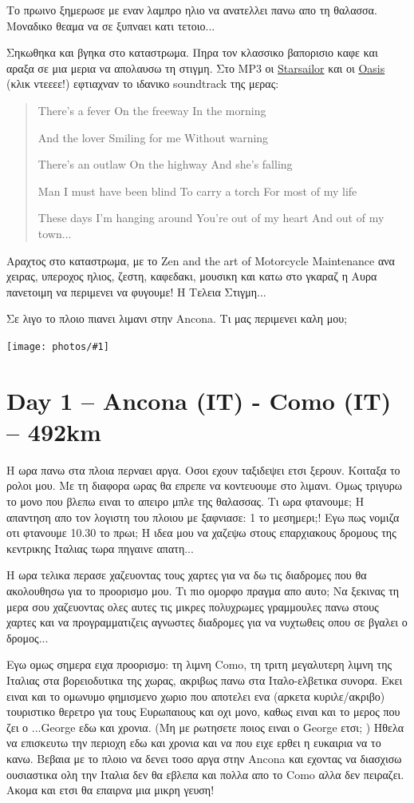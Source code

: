 \documentclass[11pt, letterpaper]{book}
\newcommand\photo[1]{\noindent\texttt{[image: photos/\#1]}}
\begin{document}
Το πρωινο ξημερωσε με εναν λαμπρο ηλιο να ανατελλει πανω απο τη θαλασσα. Μοναδικο θεαμα να σε ξυπναει κατι τετοιο...

Σηκωθηκα και βγηκα στο καταστρωμα. Πηρα τον κλασσικο βαπορισιο καφε και αραξα σε μια μερια να απολαυσω τη στιγμη. Στο MP3 οι \href{http://goo.gl/HcaG4}{Starsailor} και οι \href{http://goo.gl/6sdDG}{Oasis} (κλικ ντεεεε!) εφτιαχναν το ιδανικο soundtrack της μερας:

\begin{verse}
There's a fever
On the freeway
In the morning

And the lover
Smiling for me
Without warning

There's an outlaw
On the highway
And she's falling

Man I must have been blind
To carry a torch
For most of my life

These days I'm hanging around
You're out of my heart
And out of my town...
\end{verse}

Αραχτος στο καταστρωμα, με το Zen and the art of Motorcycle Maintenance ανα χειρας, υπεροχος ηλιος, ζεστη, καφεδακι, μουσικη και κατω στο γκαραζ η Αυρα πανετοιμη να περιμενει να φυγουμε! Η Τελεια Στιγμη...

Σε λιγο το πλοιο πιανει λιμανι στην Ancona. Τι μας περιμενει καλη μου;

\photo{5.jpg}

\chapter{Day 1 -- Ancona (IT) - Como (IT) -- 492km}

Η ωρα πανω στα πλοια περναει αργα. Οσοι εχουν ταξιδεψει ετσι ξερουν. Κοιταξα το ρολοι μου. Με τη διαφορα ωρας θα επρεπε να κοντευουμε στο λιμανι. Ομως τριγυρω το μονο που βλεπω ειναι το απειρο μπλε της θαλασσας. Τι ωρα φτανουμε; Η απαντηση απο τον λογιστη του πλοιου με ξαφνιασε: 1 το μεσημερι;! Εγω πως νομιζα οτι φτανουμε 10.30 το πρωι; Η ιδεα μου να χαζεψω στους επαρχιακους δρομους της κεντρικης Ιταλιας τωρα πηγαινε απατη...

Η ωρα τελικα περασε χαζευοντας τους χαρτες για να δω τις διαδρομες που θα ακολουθησω για το προορισμο μου. Τι πιο ομορφο πραγμα απο αυτο; Να ξεκινας τη μερα σου χαζευοντας ολες αυτες τις μικρες πολυχρωμες γραμμουλες πανω στους χαρτες και να προγραμματιζεις αγνωστες διαδρομες για να νυχτωθεις οπου σε βγαλει ο δρομος...

Εγω ομως σημερα ειχα προορισμο: τη λιμνη Como, τη τριτη μεγαλυτερη λιμνη της Ιταλιας στα βορειοδυτικα της χωρας, ακριβως πανω στα Ιταλο-ελβετικα συνορα. Εκει ειναι και το ομωνυμο φημισμενο χωριο που αποτελει ενα (αρκετα κυριλε/ακριβο) τουριστικο θερετρο για τους Ευρωπαιους και οχι μονο, καθως ειναι και το μερος που ζει ο ...George εδω και χρονια. (Μη με ρωτησετε ποιος ειναι ο George ετσι; )
Ηθελα να επισκευτω την περιοχη εδω και χρονια και να που ειχε ερθει η ευκαιρια να το κανω. Βεβαια με το πλοιο να δενει τοσο αργα στην Ancona και εχοντας να διασχισω ουσιαστικα ολη την Ιταλια δεν θα εβλεπα και πολλα απο το Como αλλα δεν πειραζει. Ακομα και ετσι θα επαιρνα μια μικρη γευση!
\end{document}
